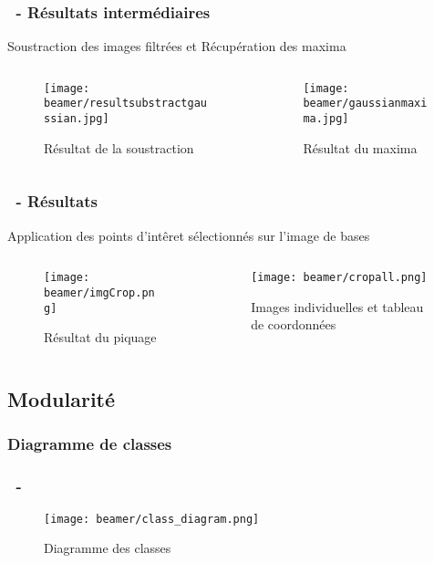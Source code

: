 \documentclass[11pt]{beamer}
\begin{document}
\begin{frame}
\frametitle{\subsecname ~- Résultats intermédiaires}
Soustraction des images filtrées et Récupération des maxima
\begin{columns}
\begin{column}{5cm}
			\begin{figure}
				\texttt{[image: beamer/resultsubstractgaussian.jpg]}
				
				Résultat de la soustraction
			\end{figure}
\end{column}
\begin{column}{5cm}
			\begin{figure}
				\texttt{[image: beamer/gaussianmaxima.jpg]}
				
				Résultat du maxima
			\end{figure}
\end{column}
\end{columns}
\end{frame}
\begin{frame}
\frametitle{\subsecname ~- Résultats}
Application des points d'intêret sélectionnés sur l'image de bases
	\begin{columns}
		\begin{column}{5cm}
			\begin{figure}
				\texttt{[image: beamer/imgCrop.png]}
				
				Résultat du piquage
			\end{figure}
		\end{column}
		\begin{column}{5cm}
			\begin{figure}
				\texttt{[image: beamer/cropall.png]}
				
				Images individuelles et tableau de coordonnées
			\end{figure}
		\end{column}
	\end{columns}
\end{frame}
\subsection{Modularité}
\subsubsection*{Diagramme de classes}
\begin{frame}
\frametitle{\subsecname ~- \subsubsecname}
	\begin{figure}
		\texttt{[image: beamer/class\_diagram.png]}
				
		Diagramme des classes
	\end{figure}
\end{frame}
\end{document}
